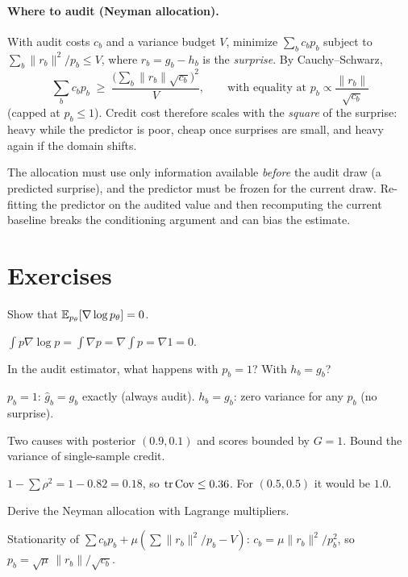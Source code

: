 \documentclass[11pt]{article}
\begin{document}
\paragraph{Where to audit (Neyman allocation).} With audit costs $c_b$ and a variance budget $V$, minimize $\sum_b c_bp_b$ subject
to $\sum_b\|r_b\|^2/p_b\le V$, where $r_b=g_b-h_b$ is the \emph{surprise}. By Cauchy--Schwarz,
\[
\sum_b c_bp_b\;\ge\;\frac{\big(\sum_b\|r_b\|\sqrt{c_b}\big)^2}{V},\qquad\text{with equality at }p_b\propto\frac{\|r_b\|}{\sqrt{c_b}}
\]
(capped at $p_b\le1$). Credit cost therefore scales with the \emph{square} of the surprise: heavy while the predictor is poor,
cheap once surprises are small, and heavy again if the domain shifts.

\begin{remark}
The allocation must use only information available \emph{before} the audit draw (a predicted surprise), and the predictor must
be frozen for the current draw. Re-fitting the predictor on the audited value and then recomputing the current baseline breaks
the conditioning argument and can bias the estimate.
\end{remark}

\section*{Exercises}
\begin{exercise} Show that $\mathbb{E}_{p_\theta}[\nabla\log p_\theta]=0$.\end{exercise}
\begin{solution} $\int p\nabla\log p=\int\nabla p=\nabla\!\int p=\nabla1=0$.\end{solution}
\begin{exercise} In the audit estimator, what happens with $p_b=1$? With $h_b=g_b$?\end{exercise}
\begin{solution} $p_b=1$: $\hat g_b=g_b$ exactly (always audit). $h_b=g_b$: zero variance for any $p_b$ (no surprise).\end{solution}
\begin{exercise} Two causes with posterior $(0.9,0.1)$ and scores bounded by $G=1$. Bound the variance of single-sample credit.\end{exercise}
\begin{solution} $1-\sum\rho^2=1-0.82=0.18$, so $\operatorname{tr}\operatorname{Cov}\le0.36$. For $(0.5,0.5)$ it would be $1.0$.\end{solution}
\begin{exercise} Derive the Neyman allocation with Lagrange multipliers.\end{exercise}
\begin{solution} Stationarity of $\sum c_bp_b+\mu(\sum\|r_b\|^2/p_b-V)$: $c_b=\mu\|r_b\|^2/p_b^2$, so $p_b=\sqrt\mu\,\|r_b\|/\sqrt{c_b}$.\end{solution}
\end{document}
